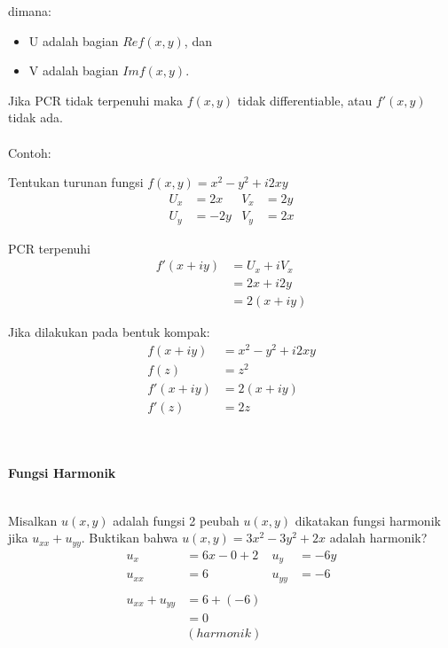 \documentclass{article}
\begin{document}
dimana:
\begin{itemize}
    \item U adalah bagian $Re f(x,y)$, dan
    \item V adalah bagian $Im f(x,y)$.
\end{itemize}

Jika PCR tidak terpenuhi maka $f(x,y)$ tidak differentiable, atau $f'(x,y)$ tidak ada.
\leavevmode\\ \\

Contoh:

Tentukan turunan fungsi $f(x,y) = x^2 -y^2 + i2xy$
\begin{align}
    U_x & = 2x  & V_x & = 2y
    \nonumber                \\
    U_y & = -2y & V_y & = 2x
    \nonumber
\end{align}

PCR terpenuhi
\begin{align}
    f'(x+iy) & = U_x +iV_x
    \nonumber              \\
             & = 2x +i2y
    \nonumber              \\
             & = 2(x+iy)
    \nonumber
\end{align}

Jika dilakukan pada bentuk kompak:
\begin{align}
    f(x+iy)  & = x^2 -y^2 + i2xy
    \nonumber                    \\
    f(z)     & = z^2
    \nonumber                    \\
    f'(x+iy) & = 2(x+iy)
    \nonumber                    \\
    f'(z)    & = 2z
    \nonumber
\end{align}
\leavevmode\\ \\


\newpage
\begin{center}
    \textbf{Fungsi Harmonik}
\end{center}
\leavevmode\\

Misalkan $u(x,y)$ adalah fungsi 2 peubah $u(x,y)$ dikatakan fungsi harmonik jika $u_{xx} + u_{yy}$. Buktikan bahwa $u(x,y) = 3x^2 - 3y^2 + 2x$ adalah harmonik?
\begin{align}
    u_x             & = 6x-0+2   & u_y    & = -6y
    \nonumber                                     \\
    u_{xx}          & = 6        & u_{yy} & = -6
    \nonumber                                     \\
    \nonumber                                     \\
    u_{xx} + u_{yy} & = 6 + (-6)
    \nonumber                                     \\
                    & = 0
    \nonumber                                     \\
                    & (harmonik)
    \nonumber
\end{align}
\end{document}
